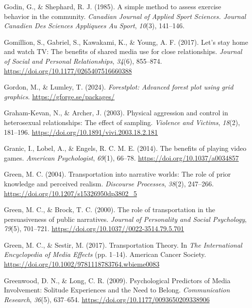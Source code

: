 \documentclass[
]{udthesis}
\newlength{\cslhangindent}
\newenvironment{CSLReferences}[2] %
 {\begin{list}{}{%
  \setlength{\itemindent}{0pt}
  \setlength{\leftmargin}{0pt}
  \setlength{\parsep}{0pt}
  \ifodd #1
   \setlength{\leftmargin}{\cslhangindent}
   \setlength{\itemindent}{-1\cslhangindent}
  \fi
  \setlength{\itemsep}{#2\baselineskip}}}
 {\end{list}}
\begin{document}
\begin{CSLReferences}{1}{0}
Godin, G., \& Shephard, R. J. (1985). A simple method to assess exercise behavior in the community. \emph{Canadian Journal of Applied Sport Sciences. Journal Canadien Des Sciences Appliquees Au Sport}, \emph{10}(3), 141--146.

Gomillion, S., Gabriel, S., Kawakami, K., \& Young, A. F. (2017). Let{'}s stay home and watch TV: The benefits of shared media use for close relationships. \emph{Journal of Social and Personal Relationships}, \emph{34}(6), 855--874. \url{https://doi.org/10.1177/0265407516660388}

Gordon, M., \& Lumley, T. (2024). \emph{Forestplot: Advanced forest plot using grid graphics}. \url{https://gforge.se/packages/}

Graham-Kevan, N., \& Archer, J. (2003). Physical aggression and control in heterosexual relationships: {The} effect of sampling. \emph{Violence and Victims}, \emph{18}(2), 181--196. \url{https://doi.org/10.1891/vivi.2003.18.2.181}

Granic, I., Lobel, A., \& Engels, R. C. M. E. (2014). The benefits of playing video games. \emph{American Psychologist}, \emph{69}(1), 66--78. \url{https://doi.org/10.1037/a0034857}

Green, M. C. (2004). Transportation into narrative worlds: The role of prior knowledge and perceived realism. \emph{Discourse Processes}, \emph{38}(2), 247--266. \url{https://doi.org/10.1207/s15326950dp3802_5}

Green, M. C., \& Brock, T. C. (2000). The role of transportation in the persuasiveness of public narratives. \emph{Journal of Personality and Social Psychology}, \emph{79}(5), 701--721. \url{https://doi.org/10.1037//0022-3514.79.5.701}

Green, M. C., \& Sestir, M. (2017). Transportation {Theory}. In \emph{The {International Encyclopedia} of {Media Effects}} (pp. 1--14). {American Cancer Society}. \url{https://doi.org/10.1002/9781118783764.wbieme0083}

Greenwood, D. N., \& Long, C. R. (2009). Psychological Predictors of Media Involvement: Solitude Experiences and the Need to Belong. \emph{Communication Research}, \emph{36}(5), 637--654. \url{https://doi.org/10.1177/0093650209338906}


\end{CSLReferences}
\end{document}
